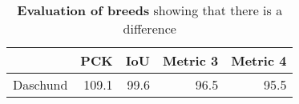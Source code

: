 \begin{table}[]
\small
\centering
\begin{tabular}{@{}lrrrr@{}}
\toprule
\multicolumn{1}{l}{} & 
\multicolumn{1}{c}{PCK}         & 
\multicolumn{1}{c}{IoU}         & 
\multicolumn{1}{c}{Metric 3}         & 
\multicolumn{1}{c}{Metric 4}          
\\ \midrule
\multicolumn{1}{r}{Daschund}             & 109.1                    & 99.6                     & 96.5                     & 95.5                     \\

\end{tabular}
\vspace{1em}
\caption{\label{tab:breed}\textbf{Evaluation of breeds} showing that there is a difference}
\end{table}